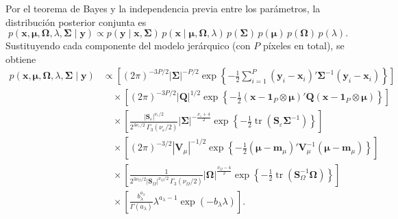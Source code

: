 \documentclass[11pt,a4paper]{article}
\begin{document}
Por el teorema de Bayes y la independencia previa entre los parámetros, la distribución posterior conjunta es
\[
p(\boldsymbol{x}, \boldsymbol{\mu}, \mathbf{\Omega}, \lambda, \mathbf{\Sigma} \mid \boldsymbol{y}) \propto p(\boldsymbol{y} \mid \boldsymbol{x}, \mathbf{\Sigma}) \, p(\boldsymbol{x} \mid \boldsymbol{\mu}, \mathbf{\Omega}, \lambda) \, p(\mathbf{\Sigma}) \, p(\boldsymbol{\mu}) \, p(\mathbf{\Omega}) \, p(\lambda).
\]
Sustituyendo cada componente del modelo jerárquico (con $P$ píxeles en total), se obtiene
\begin{align*}
p(\boldsymbol{x}, \boldsymbol{\mu}, \mathbf{\Omega}, \lambda, \mathbf{\Sigma} \mid \boldsymbol{y})
&\propto \left[ (2\pi)^{-3P/2} |\mathbf{\Sigma}|^{-P/2} \exp\left\{ -\frac{1}{2} \sum_{i=1}^{P} (\boldsymbol{y}_i - \boldsymbol{x}_i)' \mathbf{\Sigma}^{-1} (\boldsymbol{y}_i - \boldsymbol{x}_i) \right\} \right] \\
&\quad \times \left[ (2\pi)^{-3P/2} |\mathbf{Q}|^{1/2} \exp\left\{ -\frac{1}{2} (\boldsymbol{x} - \boldsymbol{1}_P \otimes \boldsymbol{\mu})' \mathbf{Q} (\boldsymbol{x} - \boldsymbol{1}_P \otimes \boldsymbol{\mu}) \right\} \right] \\
&\quad \times \left[ \frac{|\mathbf{S}_\varepsilon|^{\nu_\varepsilon / 2}}{2^{3\nu_\varepsilon / 2}\, \Gamma_3(\nu_\varepsilon / 2)} |\mathbf{\Sigma}|^{-\frac{\nu_\varepsilon + 4}{2}} \exp\left\{ -\frac{1}{2} \operatorname{tr}(\mathbf{S}_\varepsilon \mathbf{\Sigma}^{-1}) \right\} \right] \\
&\quad \times \left[ (2\pi)^{-3/2} |\mathbf{V}_\mu|^{-1/2} \exp\left\{ -\frac{1}{2} (\boldsymbol{\mu} - \boldsymbol{m}_\mu)' \mathbf{V}_\mu^{-1} (\boldsymbol{\mu} - \boldsymbol{m}_\mu) \right\} \right] \\
&\quad \times \left[ \frac{1}{2^{3\nu_\Omega / 2} |\mathbf{S}_\Omega|^{\nu_\Omega / 2}\, \Gamma_3(\nu_\Omega / 2)} |\mathbf{\Omega}|^{\frac{\nu_\Omega - 4}{2}} \exp\left\{ -\frac{1}{2} \operatorname{tr}(\mathbf{S}_\Omega^{-1} \mathbf{\Omega}) \right\} \right] \\
&\quad \times \left[ \frac{b_\lambda^{a_\lambda}}{\Gamma(a_\lambda)} \lambda^{a_\lambda - 1} \exp(-b_\lambda \lambda) \right].
\end{align*}
\end{document}
